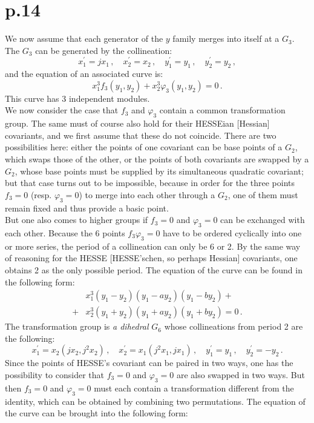 \documentclass[leqno]{article}
\begin{document}
\section{p.14}
We now assume that each generator of the $y$ family merges into itself at a $G_3$. The $G_3$ can be generated by the collineation:
\[
x_1^\prime = j x_1 \, , \quad x_2^\prime = x_2 \, , \quad y_1^\prime = y_1 \, , \quad y_2^\prime = y_2 \, ,
\]
and the equation of an associated curve is:
\begin{equation}\label{eq: 5.9}
x_1^3 f_3 (y_1, y_2) + x_2^3 \varphi_3 (y_1, y_2) = 0 \, . \tag{9}
\end{equation}
This curve has 3 independent modules. \\
We now consider the case that $f_3$ and $\varphi_3$ contain a common transformation group. The same must of course also hold for their HESSEian [Hessian] covariants, and we first assume that these do not coincide. There are two possibilities here: either the points of one covariant can be base points of a $G_2$, which swaps those of the other, or the points of both covariants are swapped by a $G_2$, whose base points must be supplied by its simultaneous quadratic covariant; but that case turns out to be impossible, because in order for the three points $f_3=0$ (resp. $\varphi_3=0$) to merge into each other through a $G_2$, one of them must remain fixed and thus provide a basic point. \\
But one also comes to higher groups if $f_3=0$ and $\varphi_3=0$ can be exchanged with each other. Because the 6 points $f_3 \varphi_3 = 0$ have to be ordered cyclically into one or more series, the period of a collineation can only be 6 or 2.
By the same way of reasoning for the HESSE [HESSE'schen, so perhaps Hessian] covariants, one obtains 2 as the only possible period. The equation of the curve can be found in the following form:
\begin{align}\label{eq: 5.10}
 & x_1^3(y_1 - y_2)(y_1 - ay_2)(y_1 - b y_2) + \tag{10}\\ 
 +& x_2^3(y_1 + y_2)(y_1 + a y_2) (y_1 + b y_2) = 0 \, . \nonumber 
\end{align}
The transformation group is \textit{a dihedral} $G_6$ whose collineations from period 2 are the following:
\[
x_1^\prime = x_2 (j x_2, j^2 x_2) \, , \quad x_2^\prime = x_1 (j^2 x_1 , j x_1) \, , \quad y_1^\prime = y_1 \, , \quad y_2^\prime = - y_2 \, . 
\]
Since the points of HESSE's covariant can be paired in two ways, one has the possibility to consider that $f_3 = 0$ and $\varphi_3 = 0$ are also swapped in two ways. But then $f_3=0$ and $\varphi_3=0$ must each contain a transformation different from the identity, which can be obtained by combining two permutations. The equation of the curve can be brought into the following form:
\end{document}
